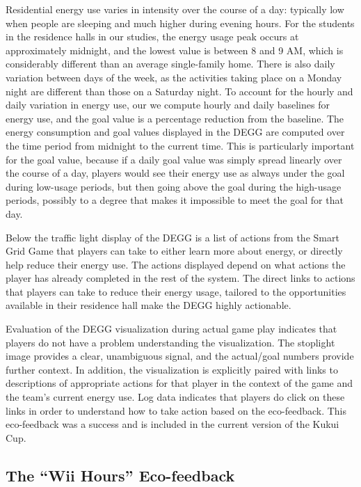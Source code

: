 \documentclass{sigchi}
\begin{document}
Residential energy use varies in intensity over the course of a day: typically low when people are sleeping and much higher during evening hours. For the students in the residence halls in our studies, the energy usage peak occurs at approximately midnight, and the lowest value is between 8 and 9 AM, which is considerably different than an average single-family home. There is also daily variation between days of the week, as the activities taking place on a Monday night are different than those on a Saturday night. To account for the hourly and daily variation in energy use, our we compute hourly and daily baselines for energy use, and the goal value is a percentage reduction from the baseline. The energy consumption and goal values displayed in the DEGG are computed over the time period from midnight to the current time. This is particularly important for the goal value, because if a daily goal value was simply spread linearly over the course of a day, players would see their energy use as always under the goal during low-usage periods, but then going above the goal during the high-usage periods, possibly to a degree that makes it impossible to meet the goal for that day.

Below the traffic light display of the DEGG is a list of actions from the Smart Grid Game that players can take to either learn more about energy, or directly help reduce their energy use. The actions displayed depend on what actions the player has already completed in the rest of the system. The direct links to actions that players can take to reduce their energy usage, tailored to the opportunities available in their residence hall make the DEGG highly actionable.

Evaluation of the DEGG visualization during actual game play indicates that players do not have a problem understanding the visualization. The stoplight image provides a clear, unambiguous signal, and the actual/goal numbers provide further context.  In addition, the visualization is explicitly paired with links to descriptions of appropriate actions for that player in the context of the game and the team's current energy use.  Log data indicates that players do click on these links in order to understand how to take action based on the eco-feedback.  This eco-feedback was a success and is included in the current version of the Kukui Cup.

\subsection{The ``Wii Hours'' Eco-feedback}
\end{document}
